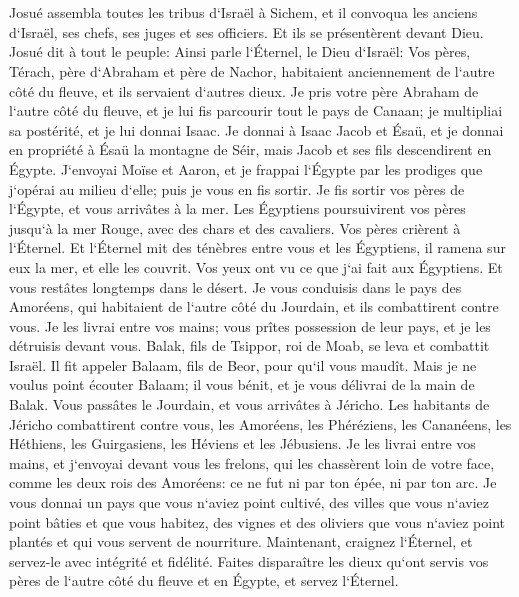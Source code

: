 \chapter{}

\verse Josué assembla toutes les tribus d`Israël à Sichem, et il convoqua les anciens d`Israël, ses chefs, ses juges et ses officiers. Et ils se présentèrent devant Dieu. 
\verse Josué dit à tout le peuple: Ainsi parle l`Éternel, le Dieu d`Israël: Vos pères, Térach, père d`Abraham et père de Nachor, habitaient anciennement de l`autre côté du fleuve, et ils servaient d`autres dieux. 
\verse Je pris votre père Abraham de l`autre côté du fleuve, et je lui fis parcourir tout le pays de Canaan; je multipliai sa postérité, et je lui donnai Isaac. 
\verse Je donnai à Isaac Jacob et Ésaü, et je donnai en propriété à Ésaü la montagne de Séir, mais Jacob et ses fils descendirent en Égypte. 
\verse J`envoyai Moïse et Aaron, et je frappai l`Égypte par les prodiges que j`opérai au milieu d`elle; puis je vous en fis sortir. 
\verse Je fis sortir vos pères de l`Égypte, et vous arrivâtes à la mer. Les Égyptiens poursuivirent vos pères jusqu`à la mer Rouge, avec des chars et des cavaliers. 
\verse Vos pères crièrent à l`Éternel. Et l`Éternel mit des ténèbres entre vous et les Égyptiens, il ramena sur eux la mer, et elle les couvrit. Vos yeux ont vu ce que j`ai fait aux Égyptiens. Et vous restâtes longtemps dans le désert. 
\verse Je vous conduisis dans le pays des Amoréens, qui habitaient de l`autre côté du Jourdain, et ils combattirent contre vous. Je les livrai entre vos mains; vous prîtes possession de leur pays, et je les détruisis devant vous. 
\verse Balak, fils de Tsippor, roi de Moab, se leva et combattit Israël. Il fit appeler Balaam, fils de Beor, pour qu`il vous maudît. 
\verse Mais je ne voulus point écouter Balaam; il vous bénit, et je vous délivrai de la main de Balak. 
\verse Vous passâtes le Jourdain, et vous arrivâtes à Jéricho. Les habitants de Jéricho combattirent contre vous, les Amoréens, les Phéréziens, les Cananéens, les Héthiens, les Guirgasiens, les Héviens et les Jébusiens. Je les livrai entre vos mains, 
\verse et j`envoyai devant vous les frelons, qui les chassèrent loin de votre face, comme les deux rois des Amoréens: ce ne fut ni par ton épée, ni par ton arc. 
\verse Je vous donnai un pays que vous n`aviez point cultivé, des villes que vous n`aviez point bâties et que vous habitez, des vignes et des oliviers que vous n`aviez point plantés et qui vous servent de nourriture. 
\verse Maintenant, craignez l`Éternel, et servez-le avec intégrité et fidélité. Faites disparaître les dieux qu`ont servis vos pères de l`autre côté du fleuve et en Égypte, et servez l`Éternel. 
